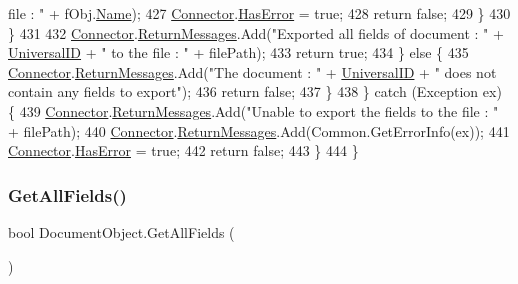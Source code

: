 \begin{DoxyCode}
{       file : "} + fObj.\mbox{\hyperlink{class_file_object_a9d47aff166393cb47490da2661576d62}{Name}});
427                         \mbox{\hyperlink{class_connector}{Connector}}.\mbox{\hyperlink{class_connector_a9365777a6b7b711b75bcfa6c4d53e989}{HasError}} = \textcolor{keyword}{true};
428                         \textcolor{keywordflow}{return} \textcolor{keyword}{false};
429                     \}
430                 \}
431 
432                 \mbox{\hyperlink{class_connector}{Connector}}.\mbox{\hyperlink{class_connector_a1ed422674b344524fd77998dcf6a9ba6}{ReturnMessages}}.Add(\textcolor{stringliteral}{"Exported all fields of document : "} + 
      \mbox{\hyperlink{class_document_object_a8b96d04632a2802e7cc5466ca5cee8cf}{UniversalID}} + \textcolor{stringliteral}{" to the file : "} + filePath);
433                 \textcolor{keywordflow}{return} \textcolor{keyword}{true};
434             \} \textcolor{keywordflow}{else} \{
435                 \mbox{\hyperlink{class_connector}{Connector}}.\mbox{\hyperlink{class_connector_a1ed422674b344524fd77998dcf6a9ba6}{ReturnMessages}}.Add(\textcolor{stringliteral}{"The document : "} + 
      \mbox{\hyperlink{class_document_object_a8b96d04632a2802e7cc5466ca5cee8cf}{UniversalID}} + \textcolor{stringliteral}{" does not contain any fields to export"});
436                 \textcolor{keywordflow}{return} \textcolor{keyword}{false};
437             \}
438         \} \textcolor{keywordflow}{catch} (Exception ex) \{
439             \mbox{\hyperlink{class_connector}{Connector}}.\mbox{\hyperlink{class_connector_a1ed422674b344524fd77998dcf6a9ba6}{ReturnMessages}}.Add(\textcolor{stringliteral}{"Unable to export the fields to the file : 
      "} + filePath);
440             \mbox{\hyperlink{class_connector}{Connector}}.\mbox{\hyperlink{class_connector_a1ed422674b344524fd77998dcf6a9ba6}{ReturnMessages}}.Add(Common.GetErrorInfo(ex));
441             \mbox{\hyperlink{class_connector}{Connector}}.\mbox{\hyperlink{class_connector_a9365777a6b7b711b75bcfa6c4d53e989}{HasError}} = \textcolor{keyword}{true};
442             \textcolor{keywordflow}{return} \textcolor{keyword}{false};
443         \}
444     \}
\end{DoxyCode}
\mbox{\label{class_document_object_a5e070c7c0a45ac06422ee992c841e780}} 
\subsubsection{\texorpdfstring{Get\+All\+Fields()}{GetAllFields()}}
{\footnotesize\ttfamily bool Document\+Object.\+Get\+All\+Fields (\begin{DoxyParamCaption}{ }\end{DoxyParamCaption})}



